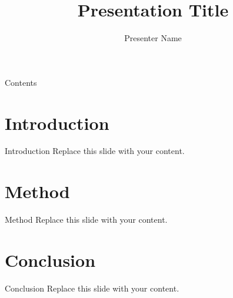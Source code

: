 \documentclass[11pt]{beamer}
\author{Presenter Name}
\title{Presentation Title}
\institute{University or Organization}
\begin{document}
\begin{frame}
\titlepage
\end{frame}

\begin{frame}{Contents}
\tableofcontents
\end{frame}

\section{Introduction}
\begin{frame}{Introduction}
    Replace this slide with your content.
\end{frame}

\section{Method}
\begin{frame}{Method}
    Replace this slide with your content.
\end{frame}

\section{Conclusion}
\begin{frame}{Conclusion}
    Replace this slide with your content.
\end{frame}
\end{document}
